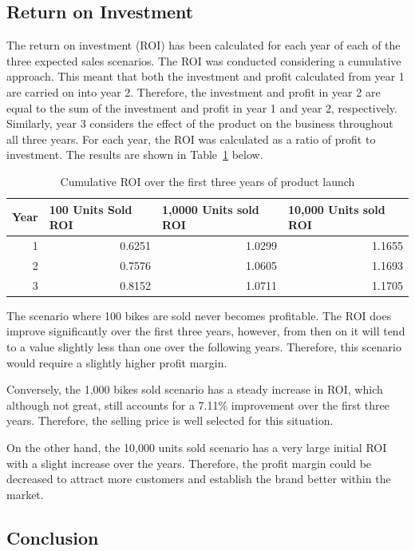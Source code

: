\documentclass[a4paper,11pt]{article}
\begin{document}
\subsection{Return on Investment}

The return on investment (ROI) has been calculated for each year of each of the three expected sales scenarios. The ROI was conducted considering a cumulative approach. This meant that both the investment and profit calculated from year 1 are carried on into year 2. Therefore, the investment and profit in year 2 are equal to the sum of the investment and profit in year 1 and year 2, respectively. Similarly, year 3 considers the effect of the product on the business throughout all three years. For each year, the ROI was calculated as a ratio of profit to investment.  The results are shown in Table~\ref{tab:ROI} below. 

\begin{table}[!ht]
	\centering
	\caption{Cumulative ROI over the first three years of product launch}
	\begin{tabular}{r r r r}
		\hline
		\multicolumn{1}{l}{Year}&\multicolumn{1}{l}{100 Units Sold ROI}&\multicolumn{1}{l}{1,0000 Units sold ROI}&\multicolumn{1}{l}{10,000 Units sold ROI}\\ \hline
		1&0.6251&1.0299&1.1655\\
		2&0.7576&1.0605&1.1693\\
		3&0.8152&1.0711&1.1705\\
	\end{tabular}
	\label{tab:ROI}
\end{table}

The scenario where 100 bikes are sold never becomes profitable. The ROI does improve significantly over the first three years, however, from then on it will tend to a value slightly less than one over the following years. Therefore, this scenario would require a slightly higher profit margin. 

Conversely, the 1,000 bikes sold scenario has a steady increase in ROI, which although not great, still accounts for a 7.11\% improvement over the first three years. Therefore, the selling price is well selected for this situation. 

On the other hand, the 10,000 units sold scenario has a very large initial ROI with a slight increase over the years. Therefore, the profit margin could be decreased to attract more customers and establish the brand better within the market.

\subsection{Conclusion}
\end{document}

